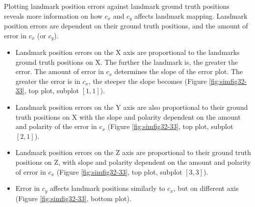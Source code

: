 Plotting landmark position errors against landmark ground truth
positions reveals more information on how $c_{x}$ and $c_{y}$
affects landmark mapping. Landmark position errors are dependent
on their ground truth positions, and the amount of error in $c_{x}$
(or $c_{y}$).

\begin{itemize}
  \item Landmark position errors on the X axis are proportional to the
  landmarks ground truth positions on X. The further the landmark is,
  the greater the error. The amount of error in $c_{x}$
  determines the slope of the error plot. The greater the error is in
  $c_{x}$, the steeper the slope becomes (Figure \ref{fig:simfig32-33},
  top plot, subplot $[1,1]$).
  \item Landmark position errors on the Y axis are also proportional to
  their ground truth positions on X with the slope and
  polarity dependent on the amount and polarity of the error in
  $c_{x}$ (Figure \ref{fig:simfig32-33}, top plot, subplot $[2,1]$).
  \item Landmark position errors on the Z axis are proportional to
  their ground truth positions on Z, with slope and polarity
  dependent on the amount and polarity of error in $c_{x}$ (Figure
  \ref{fig:simfig32-33}, top plot, subplot $[3,3]$).
  \item Error in $c_{y}$ affects landmark positions similarly to
  $c_{x}$, but on different axis (Figure \ref{fig:simfig32-33}, bottom
  plot).
\end{itemize}

